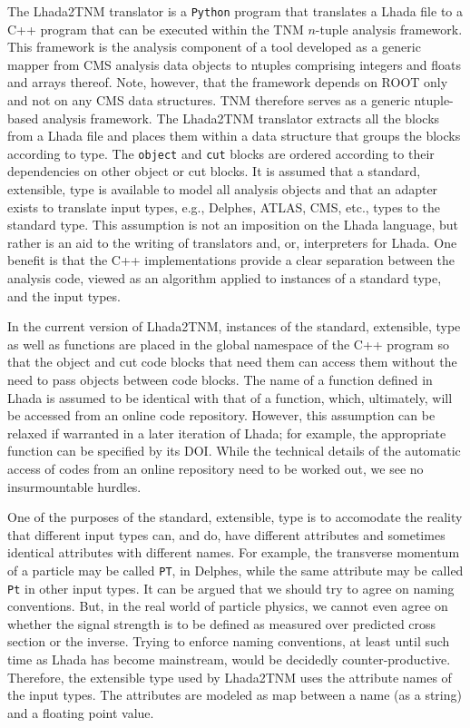 \documentclass[11pt]{cernrep}
\begin{document}
The {\sc Lhada2TNM} translator is a {\tt Python} program that translates a {\sc Lhada} file to a C++ program that can be executed within the {\sc TNM} $n$-tuple analysis framework. This framework is the analysis component of a tool developed as a generic mapper from CMS analysis data objects to ntuples comprising integers and floats and arrays thereof. Note, however, that the framework depends on {\sc ROOT} only and not on any CMS data structures. {\sc TNM} therefore serves as a generic ntuple-based analysis framework. The {\sc Lhada2TNM} translator extracts all the blocks from a {\sc Lhada} file and places them within a data structure that groups the blocks according to type. The {\tt object} and {\tt cut} blocks are ordered according to their dependencies on other object or cut blocks. It is assumed that a standard, extensible, type is available to model all analysis objects and that an adapter exists to translate input types, e.g., {\sc Delphes}, {\sc ATLAS}, {\sc CMS}, etc., types  to the standard type. This assumption is not an imposition on the {\sc Lhada} language, but rather is an aid to the writing of translators and, or, interpreters for {\sc Lhada}. One benefit is that the C++ implementations provide a clear separation between the analysis code, viewed as an algorithm applied to instances of a standard type, and the input types.   

In the current version of {\sc Lhada2TNM}, instances of the standard, extensible, type as well as functions are placed in the global namespace of the C++ program so that the object and cut code blocks
that need them can access them without the need to pass objects between code blocks. The name of a function defined in {\sc Lhada} is assumed  to be identical with that of a function, which, ultimately, will be accessed from an online code repository. However, this assumption can be relaxed if warranted in a later iteration of {\sc Lhada}; for example, the appropriate function can be specified by its {\sc DOI}.  While the technical details of the automatic access of
codes from an online repository need to be worked out, we see no insurmountable hurdles. 

One of the purposes of the standard, extensible, type is to accomodate the reality that different input types can, and do, have different attributes and sometimes identical attributes with different names. For example, the transverse momentum of a particle may be called {\tt PT}, in {\sc Delphes}, while the same attribute may be called {\tt Pt} in other input types. It can  be argued that we should try to agree on naming conventions. But, in the real world of particle physics, we cannot even agree on whether the signal strength is to be defined as measured over predicted cross section or the inverse. Trying to enforce naming conventions, at least until such time as {\sc Lhada} has become mainstream, would be decidedly counter-productive. Therefore, the extensible type used by {\sc Lhada2TNM} uses the attribute names of the input types. The attributes are modeled as map between a name (as a string) and a floating point value.   
\end{document}
